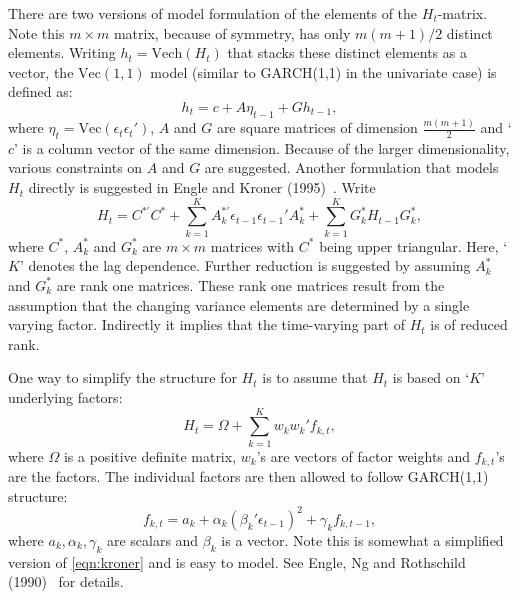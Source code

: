 There are two versions of model formulation of the elements of the $H_t$-matrix. Note this $m \times m$ matrix, because of symmetry, has only $m(m+1)/2$ distinct elements. Writing $h_t= \text{Vech}(H_t)$ that stacks these distinct elements as a vector, the $\text{Vec}(1,1)$ model (similar to GARCH(1,1) in the univariate case) is defined as:
	\begin{equation} \label{eqn:vecmodel}
	h_t= c + A \eta_{t-1} + G h_{t-1},
	\end{equation}
where $\eta_t= \text{Vec}(\epsilon_t\epsilon_t')$, $A$ and $G$ are square matrices of dimension $\frac{m(m+1)}{2}$ and `$c$' is a column vector of the same dimension. Because of the larger dimensionality, various constraints on $A$ and $G$ are suggested. Another formulation that models $H_t$ directly is suggested in Engle and Kroner (1995)~\cite{kroner}. Write
	\begin{equation} \label{eqn:kroner}
	H_t= C^{*'} C^* + \sum_{k=1}^K A_k^{*'} \epsilon_{t-1} \epsilon_{t-1}' A_k^* + \sum_{k=1}^K G_k^* H_{t-1}G_k^*,
	\end{equation}
where $C^*$, $A_k^*$ and $G_k^*$ are $m \times m$ matrices with $C^*$ being upper triangular. Here, `$K$' denotes the lag dependence. Further reduction is suggested by assuming $A_k^*$ and $G_k^*$ are rank one matrices. These rank one matrices result from the assumption that the changing variance elements are determined by a single varying factor. Indirectly it implies that the time-varying part of $H_t$ is of reduced rank. 


One way to simplify the structure for $H_t$ is to assume that $H_t$ is based on `$K$' underlying factors:
	\begin{equation} \label{eqn:factorH}
	H_t= \Omega + \sum_{k=1}^K w_k w_k' f_{k,t},
	\end{equation}
where $\Omega$ is a positive definite matrix, $w_k$'s are vectors of factor weights and $f_{k,t}$'s are the factors. The individual factors are then allowed to follow GARCH(1,1) structure:
	\begin{equation} \label{eqn:garchfactor}
	f_{k,t}= a_k + \alpha_k \left( \beta_k' \epsilon_{t-1} \right)^2 + \gamma_k f_{k,t-1},
	\end{equation}
where $a_k,\alpha_k,\gamma_k$ are scalars and $\beta_k$ is a vector. Note this is somewhat a simplified version of \eqref{eqn:kroner} and is easy to model. See Engle, Ng and Rothschild (1990)~\cite{engleng} for details. 


